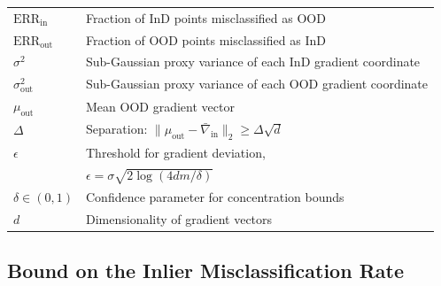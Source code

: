\documentclass[10pt]{article} %
\theoremstyle{plain}
\theoremstyle{definition}
\begin{document}
\begin{table}[h]
\begin{tabularx}{\textwidth}{@{} p{} X @{}}
\midrule
\( \mathrm{ERR}_{\mathrm{in}} \) & Fraction of InD points misclassified as OOD \\
\( \mathrm{ERR}_{\mathrm{out}} \) & Fraction of OOD points misclassified as InD \\
\midrule
\( \sigma^2 \) & Sub-Gaussian proxy variance of each InD gradient coordinate \\
\( \sigma_{\mathrm{out}}^2 \) & Sub-Gaussian proxy variance of each OOD gradient coordinate \\
\( \mu_{\mathrm{out}} \) & Mean OOD gradient vector \\
\( \Delta \) & Separation: \( \|\mu_{\mathrm{out}} - \bar{\nabla}_{\mathrm{in}}\|_2 \geq \Delta\sqrt{d} \) \\
\( \epsilon \) & Threshold for gradient deviation, \\
& \( \epsilon = \sigma \sqrt{2 \log(4 d m / \delta)} \) \\
\( \delta \in (0,1) \) & Confidence parameter for concentration bounds \\
\( d \) & Dimensionality of gradient vectors \\
\bottomrule
\end{tabularx}
\end{table}




\subsection{Bound on the Inlier Misclassification Rate}
\end{document}
